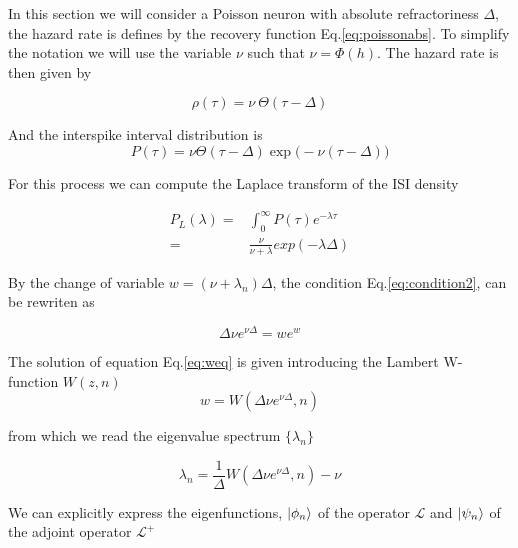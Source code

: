 \documentclass[a4paper,11pt,twoside]{article}
\def \be {\begin{equation}}
\def \ee {\end{equation}}
\numberwithin{equation}{section}
\begin{document}
In this section we will consider a Poisson neuron with absolute refractoriness $\Delta$, the hazard rate is defines by the recovery function Eq.\eqref{eq:poissonabs}.
To simplify the notation we will use the variable $\nu$ such that $\nu=\Phi(h)$. The hazard rate is then given by

\begin{equation}
\rho(\tau)=\nu\:\Theta(\tau-\Delta)
\end{equation}


And the interspike interval distribution is 
\begin{equation}
P(\tau)=\nu \Theta(\tau-\Delta) \exp\big(-\nu(\tau-\Delta)\big)
\end{equation}



For this process we can compute the Laplace transform of the ISI density

\begin{align}
P_L(\lambda)=&\int_0^\infty P(\tau)e^{-\lambda \tau}\nonumber\\
=&\frac{\nu}{\nu+\lambda}exp(-\lambda \Delta)
\end{align}


By the change of variable $w=(\nu+\lambda_n)\Delta$, the condition Eq.\eqref{eq:condition2}, can be rewriten as


\begin{equation}
\label{eq:weq}
\Delta \nu e^{\nu\Delta}=we^{w} 
\end{equation}

The solution of equation Eq.\eqref{eq:weq} is given introducing the Lambert W-function $W(z,n)$
\begin{equation}
w=W(\Delta \nu e^{\nu\Delta},n)
\end{equation}

from which we read the eigenvalue spectrum $\{\lambda_n\}$

\begin{equation}
\lambda_n=\frac{1}{\Delta}W(\Delta \nu e^{\nu\Delta},n) - \nu
\end{equation}


We can explicitly express the eigenfunctions, $\ket{\phi_n}$ of the operator $\mathcal{L}$ and $\ket{\psi_n}$ of  the adjoint operator $\mathcal{L}^+$
\end{document}
